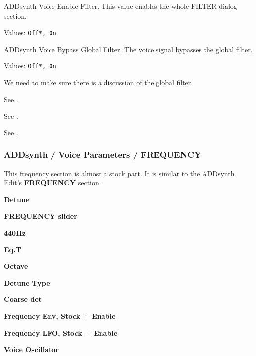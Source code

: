    \setcounter{ItemCounter}{0}      %

   ADDsynth Voice Enable Filter.
   This value enables the whole FILTER dialog section.

   Values: \texttt{Off*, On}

   ADDsynth Voice Bypass Global Filter.
   The voice signal bypasses the global filter.

   Values: \texttt{Off*, On}

   We need to make sure there is a discussion of the global filter.

   See .

   See .

   See .

\subsubsection{ADDsynth / Voice Parameters / FREQUENCY}
\label{subsubsec:addsynth_voice_parameters_frequency}

   This frequency section is almost a stock part.
   It is similar to the ADDsynth Edit's \textbf{FREQUENCY} section.

   \begin{enumber}
      \item \textbf{Detune}
      \item \textbf{FREQUENCY slider}
      \item \textbf{440Hz}          %
      \item \textbf{Eq.T}          %
      \item \textbf{Octave}
      \item \textbf{Detune Type}
      \item \textbf{Coarse det}
      \item \textbf{Frequency Env, Stock + Enable}
      \item \textbf{Frequency LFO, Stock + Enable}
      \item \textbf{Voice Oscillator}
   \end{enumber}

